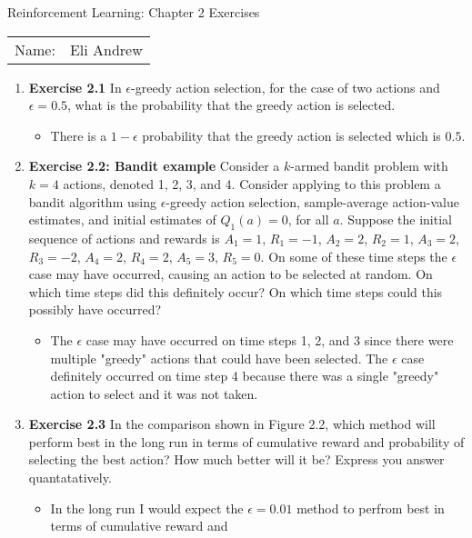 \documentclass[12pt]{article}
\begin{document}
\begin{center}
{\Large Reinforcement Learning: Chapter 2 Exercises}

\begin{tabular}{rl}
Name: & Eli Andrew
\end{tabular}
\end{center}

\begin{enumerate}[label=(\alph*)]
  \item \textbf{Exercise 2.1} In $\epsilon$-greedy action selection, for the case of two actions
  and $\epsilon = 0.5$, what is the probability that the greedy action is selected. 
  \begin{itemize}
    \item There is a $1 - \epsilon$ probability that the greedy action is selected which is $0.5$. 
  \end{itemize}
  \item \textbf{Exercise 2.2: Bandit example} Consider a $k$-armed bandit problem with $k=4$ actions,
  denoted 1, 2, 3, and 4. Consider applying to this problem a bandit algorithm using $\epsilon$-greedy
  action selection, sample-average action-value estimates, and initial estimates of $Q_1(a) = 0$, for all
  $a$. Suppose the initial sequence of actions and rewards is $A_1 = 1$, $R_1 = -1$, $A_2 = 2$, $R_2 = 1$,
  $A_3 = 2$, $R_3 = -2$, $A_4 = 2$, $R_4 = 2$, $A_5 = 3$, $R_5 = 0$. On some of these time steps the $\epsilon$
  case may have occurred, causing an action to be selected at random. On which time steps did this definitely occur?
  On which time steps could this possibly have occurred?
  \begin{itemize}
    \item The $\epsilon$ case may have occurred on time steps 1, 2, and 3 since there were multiple "greedy" actions
    that could have been selected. The $\epsilon$ case definitely occurred on time step 4 because there was a single
    "greedy" action to select and it was not taken.
  \end{itemize}
  \item \textbf{Exercise 2.3} In the comparison shown in Figure 2.2, which method will perform best in the long run in
  terms of cumulative reward and probability of selecting the best action? How much better will it be? Express you answer
  quantatatively.
  \begin{itemize}
    \item In the long run I would expect the $\epsilon = 0.01$ method to perfrom best in terms of cumulative reward and

\end{itemize}
\end{enumerate}
\end{document}
